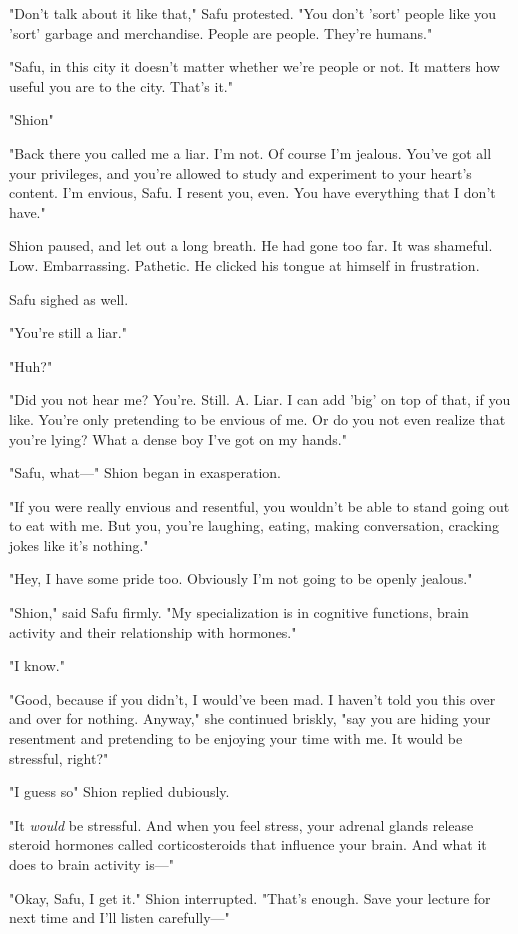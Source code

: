 "Don't talk about it like that," Safu protested. "You don't 'sort'
people like you 'sort' garbage and merchandise. People are people.
They're humans."

"Safu, in this city it doesn't matter whether we're people or not. It
matters how useful you are to the city. That's it."

"Shion\el "

"Back there you called me a liar. I'm not. Of course I'm jealous. You've
got all your privileges, and you're allowed to study and experiment to
your heart's content. I'm envious, Safu. I resent you, even. You have
everything that I don't have."

Shion paused, and let out a long breath. He had gone too far. It was
shameful. Low. Embarrassing. Pathetic. He clicked his tongue at himself
in frustration.

Safu sighed as well.

"You're still a liar."

"Huh?"

"Did you not hear me? You're. Still. A. Liar. I can add 'big' on top of
that, if you like. You're only pretending to be envious of me. Or do you
not even realize that you're lying? What a dense boy I've got on my
hands."

"Safu, what---" Shion began in exasperation.

"If you were really envious and resentful, you wouldn't be able to stand
going out to eat with me. But you, you're laughing, eating, making
conversation, cracking jokes like it's nothing."

"Hey, I have some pride too. Obviously I'm not going to be openly
jealous."

"Shion," said Safu firmly. "My specialization is in cognitive functions,
brain activity and their relationship with hormones."

"I know."

"Good, because if you didn't, I would've been mad. I haven't told you
this over and over for nothing. Anyway," she continued briskly, "say you
are hiding your resentment and pretending to be enjoying your time with
me. It would be stressful, right?"

"I guess so\el " Shion replied dubiously.

"It \emph{would} be stressful. And when you feel stress, your adrenal glands
release steroid hormones called corticosteroids that influence your
brain. And what it does to brain activity is---"

"Okay, Safu, I get it." Shion interrupted. "That's enough. Save your
lecture for next time and I'll listen carefully---"

